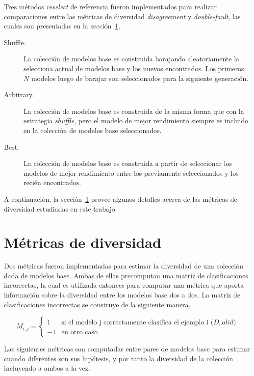 Tres métodos \textit{reselect} de referencia fueron implementados para realizar comparaciones entre las métricas de diversidad \textit{disagreement} y \textit{double-fault}, las cuales son presentadas en la sección~\ref{section:diversity-meassures}.
\begin{description}
    \item[Shuffle.]
    La colección de modelos base es construida barajando aleatoriamente la selecciona actual de modelos base y los nuevos encontrados.
    Los primeros $N$ modelos luego de barajar son seleccionados para la siguiente generación.
    \item[Arbitrary.]
    La colección de modelos base es construida de la misma forma que con la estrategia \textit{shuffle}, pero el modelo de mejor rendimiento siempre es incluido en la colección de modelos base seleccionados.
    \item[Best.]
    La colección de modelos base es construida a partir de seleccionar los modelos de mejor rendimiento entre los previamente seleccionados y los recién encontrados.
\end{description}

A continuación, la sección~\ref{section:diversity-meassures} provee algunos detalles acerca de las métricas de diversidad estudiadas en este trabajo.

\section{Métricas de diversidad}\label{section:diversity-meassures}

Dos métricas fueron implementadas para estimar la diversidad de una colección dada de modelos base.
Ambas de ellas precomputan una matriz de clasificaciones incorrectas, la cual es utilizada entonces para computar una métrica que aporta información sobre la diversidad entre los modelos base dos a dos.
La matriz de clasificaciones incorrectas se construye de la siguiente manera.

\begin{equation}
    M_{i,j} =
    \begin{cases}
        1 & \text{si el modelo j correctamente clasifica el ejemplo i ($D_valid$)} \\
        -1 & \text{en otro caso}
    \end{cases}
\end{equation}

Las siguientes métricas son computadas entre pares de modelos base para estimar cuando diferentes son sus hipótesis, y por tanto la diversidad de la colección incluyendo a ambos a la vez.

